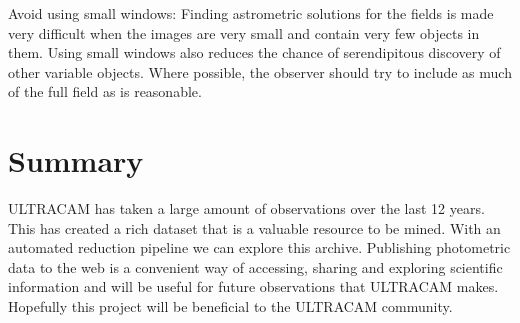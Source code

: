 {Avoid using small windows}: Finding astrometric solutions for the fields is made very difficult when the images are very small and contain very few objects in them. Using small windows also reduces the chance of serendipitous discovery of other variable objects. Where possible, the observer should try to include as much of the full field as is reasonable. 

\section{Summary}
ULTRACAM has taken a large amount of observations over the last 12 years. This has created a rich dataset that is a valuable resource to be mined. With an automated reduction pipeline we can explore this archive. Publishing photometric data to the web is a convenient way of accessing, sharing and exploring scientific information and will be useful for future observations that ULTRACAM makes. Hopefully this project will be beneficial to the ULTRACAM community. 
